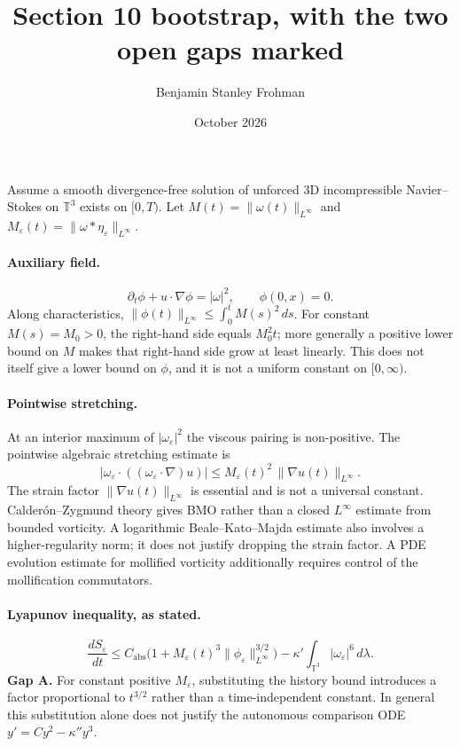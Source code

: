 \documentclass{article}
\title{Section 10 bootstrap, with the two open gaps marked}
\author{Benjamin Stanley Frohman}
\date{October 2026}
\begin{document}
\maketitle

Assume a smooth divergence-free solution of unforced 3D incompressible Navier--Stokes on $\mathbb{T}^3$ exists on $[0,T)$. Let $M(t)=\|\omega(t)\|_{L^\infty}$ and $M_\varepsilon(t)=\|\omega*\eta_\varepsilon\|_{L^\infty}$.

\paragraph{Auxiliary field.}
\[
\partial_t\phi+u\cdot\nabla\phi=|\omega|^2,\qquad \phi(0,x)=0.
\]
Along characteristics, $\|\phi(t)\|_{L^\infty}\le\int_0^t M(s)^2\,ds$. For constant $M(s)=M_0>0$, the right-hand side equals $M_0^2t$; more generally a positive lower bound on $M$ makes that right-hand side grow at least linearly. This does not itself give a lower bound on $\phi$, and it is not a uniform constant on $[0,\infty)$.

\paragraph{Pointwise stretching.}
At an interior maximum of $|\omega_\varepsilon|^2$ the viscous pairing is non-positive. The pointwise algebraic stretching estimate is
\[
|\omega_\varepsilon\cdot((\omega_\varepsilon\cdot\nabla)u)|
\le M_\varepsilon(t)^2\,\|\nabla u(t)\|_{L^\infty}.
\]
The strain factor $\|\nabla u(t)\|_{L^\infty}$ is essential and is not a universal constant. Calder\'on--Zygmund theory gives BMO rather than a closed $L^\infty$ estimate from bounded vorticity. A logarithmic Beale--Kato--Majda estimate also involves a higher-regularity norm; it does not justify dropping the strain factor. A PDE evolution estimate for mollified vorticity additionally requires control of the mollification commutators.

\paragraph{Lyapunov inequality, as stated.}
\[
\frac{dS_\varepsilon}{dt}\le C_{\mathrm{abs}}\bigl(1+M_\varepsilon(t)^3\|\phi_\varepsilon\|_{L^\infty}^{3/2}\bigr)-\kappa'\int_{\mathbb{T}^3}|\omega_\varepsilon|^6\,d\lambda.
\]
\textbf{Gap A.} For constant positive $M_\varepsilon$, substituting the history bound introduces a factor proportional to $t^{3/2}$ rather than a time-independent constant. In general this substitution alone does not justify the autonomous comparison ODE $y'=Cy^2-\kappa''y^3$.
\end{document}
